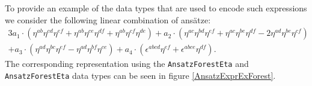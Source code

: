 \documentclass[a4paper,12pt, DIV=14, BCOR=5mm, twoside, headsepline]{scrbook}
\begin{document}
To provide an example of the data types that are used to encode such expressions we consider the following linear combination of ansätze:
\begin{multline}\label{AnsatzExprEx}
3a_1 \cdot \left (\eta^{ab}\eta^{cd}\eta^{ef} + \eta^{ab}\eta^{ce}\eta^{df} + \eta^{ab}\eta^{cf}\eta^{de} \right ) + a_2 \cdot \left ( \eta^{ac} \eta^{bd} \eta^{ef} + \eta^{ac} \eta^{be} \eta^{df} -2 \eta^{ad} \eta^{be} \eta^{cf} \right ) \\
+ a_3 \cdot \left ( \eta^{ad} \eta^{bc} \eta^{ef} - \eta^{ad} \eta^{bf} \eta^{ce} \right ) + a_4 \cdot \left ( \epsilon^{abcd} \eta^{ef} + \epsilon^{abce} \eta^{df}  \right )   .
\end{multline}
The corresponding representation using the \texttt{AnsatzForestEta} and \texttt{AnsatzForestEta} data types can be seen in figure \ref{AnsatzExprExForest}.
\end{document}
